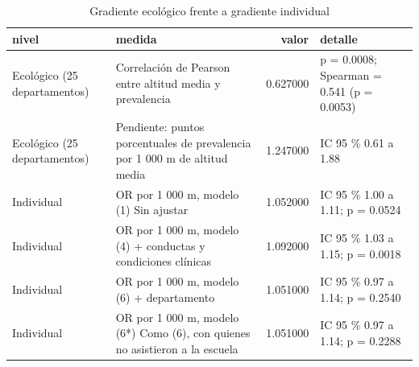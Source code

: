 \begin{table}[htbp]
\caption{Gradiente ecológico frente a gradiente individual}
\label{tab:tabla_62_ecologico_vs_individual}
\begin{tabular}{llrl}
\toprule
nivel & medida & valor & detalle \\
\midrule
Ecológico (25 departamentos) & Correlación de Pearson entre altitud media y prevalencia & 0.627000 & p = 0.0008; Spearman = 0.541 (p = 0.0053) \\
Ecológico (25 departamentos) & Pendiente: puntos porcentuales de prevalencia por 1 000 m de altitud media & 1.247000 & IC 95 \% 0.61 a 1.88 \\
Individual & OR por 1 000 m, modelo (1) Sin ajustar & 1.052000 & IC 95 \% 1.00 a 1.11; p = 0.0524 \\
Individual & OR por 1 000 m, modelo (4) + conductas y condiciones clínicas & 1.092000 & IC 95 \% 1.03 a 1.15; p = 0.0018 \\
Individual & OR por 1 000 m, modelo (6) + departamento & 1.051000 & IC 95 \% 0.97 a 1.14; p = 0.2540 \\
Individual & OR por 1 000 m, modelo (6*) Como (6), con quienes no asistieron a la escuela & 1.051000 & IC 95 \% 0.97 a 1.14; p = 0.2288 \\
\bottomrule
\end{tabular}
\end{table}
